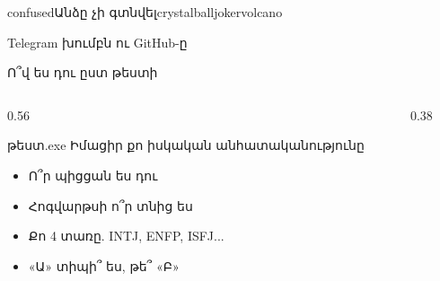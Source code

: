 
%
  {   }%
  {confused}{Անձը չի գտնվել}{{crystalball}{joker}{volcano}}

\begin{frame}{Telegram խումբն ու GitHub-ը}
  \telegramframebody
\end{frame}

\begin{frame}{Ո՞վ ես դու ըստ թեստի}
  \begin{columns}[c]
    \begin{column}{0.56\textwidth}
      \begin{popup}{թեստ.exe}
        {\blackfont\large Իմացիր քո իսկական անհատականությունը}\par\smallskip
        \begin{itemize}
          \item<2-> Ո՞ր պիցցան ես դու 
          \item<3-> Հոգվարթսի ո՞ր տնից ես 
          \item<4-> Քո 4 տառը. INTJ, ENFP, ISFJ...
          \item<5-> «Ա» տիպի՞ ես, թե՞ «Բ»
        \end{itemize}
      \end{popup}
    \end{column}
    \begin{column}{0.38\textwidth}
      \centering
      \par\medskip
    \end{column}
  \end{columns}
\end{frame}


